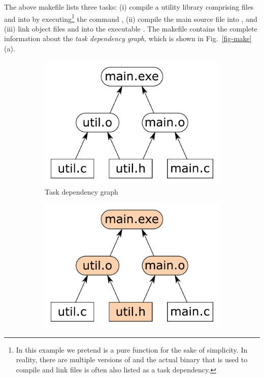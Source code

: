 \noindent
The above makefile lists three tasks: (i) compile a utility library comprising
files  and  into  by
executing\footnote{In this example we pretend  is a pure function for the
sake of simplicity. In reality, there are multiple versions of  and the
actual binary that is used to compile and link files is often also listed as a task
dependency.} the command , (ii) compile the main source file
 into , and (iii) link object files  and
 into the executable . The makefile contains the
complete information about the \emph{task dependency graph}, which is shown in
Fig.~\ref{fig-make}(a).

\begin{figure}[h]
\begin{subfigure}[b]{0.32\linewidth}
\centerline{\includegraphics[scale=0.28]{fig/make-example.pdf}}
\caption{Task dependency graph}
\end{subfigure}
\begin{subfigure}[b]{0.32\linewidth}
\centerline{\includegraphics[scale=0.28]{fig/make-example-full.pdf}}

\end{subfigure}
\end{figure}
